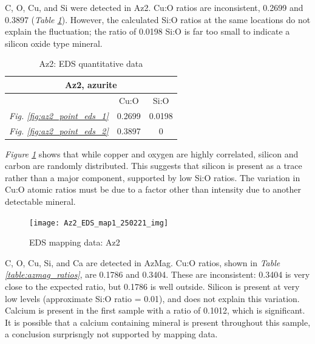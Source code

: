 
C, O, Cu, and Si were detected in Az2. Cu:O ratios are inconsistent, 0.2699 and 0.3897 (\textit{Table \ref{table:az2_ratios}}). However, the calculated Si:O ratios at the same locations do not explain the fluctuation; the ratio of 0.0198 Si:O is far too small to indicate a silicon oxide type mineral.

\begin{table}[H]
\caption{Az2: EDS quantitative data}
\centering
\label{table:az2_ratios}
\begin{tabular}{c c c}
\toprule
\multicolumn{3}{c}{Az2, azurite} \\
\midrule
~ & Cu:O & Si:O \\
\midrule
\textit{Fig. \ref{fig:az2_point_eds_1}} & 0.2699 & 0.0198 \\
\textit{Fig. \ref{fig:az2_point_eds_2}} & 0.3897 & 0 \\
\bottomrule
\end{tabular}
\end{table}

\textit{Figure \ref{fig:az2_map1}} shows that while copper and oxygen are highly correlated, silicon and carbon are randomly distributed. This suggests that silicon is present as a trace rather than a major component, supported by low Si:O ratios. The variation in Cu:O atomic ratios must be due to a factor other than intensity due to another detectable mineral.

\begin{figure}[H]
\centering
  \texttt{[image: Az2\_EDS\_map1\_250221\_img]}
\caption[EDS mapping data: Az2]{EDS mapping data: Az2}
\label{fig:az2_map1}
\end{figure}


C, O, Cu, Si, and Ca are detected in AzMag. Cu:O ratios, shown in \textit{Table \ref{table:azmag_ratios}}, are 0.1786 and 0.3404. These are inconsistent: 0.3404 is very close to the expected ratio, but 0.1786 is well outside. Silicon is present at very low levels (approximate Si:O ratio = 0.01), and does not explain this variation. Calcium is present in the first sample with a ratio of 0.1012, which is significant. It is possible that a calcium containing mineral is present throughout this sample, a conclusion surprisngly not supported by mapping data.

